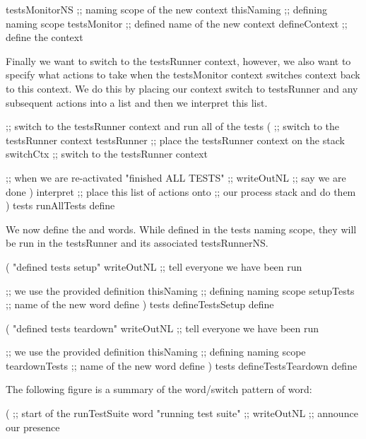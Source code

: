   testsMonitorNS  ;; naming scope of the new context
  thisNaming      ;; defining naming scope
  testsMonitor    ;; defined name of the new context
  defineContext   ;; define the context
\stopJoylolCode

Finally we want to switch to the testsRunner context, however, we also 
want to specify what actions to take when the testsMonitor context 
switches context back to this context. We do this by placing our context 
switch to testsRunner and any subsequent actions into a list and then we 
interpret this list. 

\startJoylolCode
  ;; switch to the testsRunner context and run all of the tests
  (
    ;; switch to the testsRunner context
    testsRunner ;; place the testsRunner context on the stack
    switchCtx   ;; switch to the testsRunner context
    
    ;; when we are re-activated
    "finished ALL TESTS"  ;;
    writeOutNL            ;; say we are done
  )
  interpret     ;; place this list of actions onto
                ;; our process stack and do them
)
tests
runAllTests
define
\stopJoylolCode

We now define the  and  
words. While defined in the tests naming scope, they will be run in the 
testsRunner and its associated testsRunnerNS. 

\startJoylolCode
(
  "defined tests setup"
  writeOutNL  ;; tell everyone we have been run
  
              ;; we use the provided definition
  thisNaming  ;; defining naming scope
  setupTests  ;; name of the new word
  define
)
tests
defineTestsSetup
define
\stopJoylolCode

\startJoylolCode
(
  "defined tests teardown"
  writeOutNL    ;; tell everyone we have been run
  
                ;; we use the provided definition
  thisNaming    ;; defining naming scope
  teardownTests ;; name of the new word
  define
)
tests
defineTestsTeardown
define
\stopJoylolCode

\stopTestSuite



The following figure is a summary of the word/switch pattern of 
 word: 


\startJoylolCode
(                       ;; start of the runTestSuite word
  "running test suite"  ;;
  writeOutNL            ;; announce our presence
\stopJoylolCode

